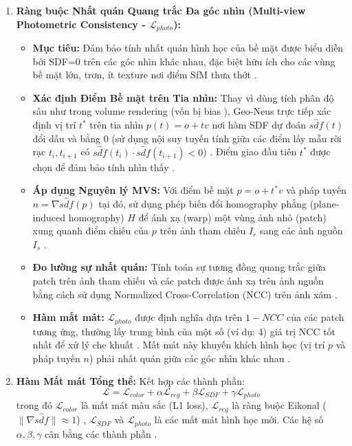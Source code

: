 \begin{enumerate}
    \item \textbf{Ràng buộc Nhất quán Quang trắc Đa góc nhìn (Multi-view Photometric Consistency - $\mathcal{L}_{photo}$):}
        \begin{itemize}
            \item \textbf{Mục tiêu:} Đảm bảo tính nhất quán hình học của bề mặt được biểu diễn bởi SDF=0 trên các góc nhìn khác nhau, đặc biệt hữu ích cho các vùng bề mặt lớn, trơn, ít texture nơi điểm SfM thưa thớt \cite{Fu2022GeoNeus_source_30, Fu2022GeoNeus_source_107, Fu2022GeoNeus_source_108, Fu2022GeoNeus_source_169}.
            \item \textbf{Xác định Điểm Bề mặt trên Tia nhìn:} Thay vì dùng tích phân độ sâu như trong volume rendering (vốn bị bias \cite{Fu2022GeoNeus_source_174, Fu2022GeoNeus_source_178}), Geo-Neus trực tiếp xác định vị trí $t^*$ trên tia nhìn $p(t) = o+tv$ nơi hàm SDF dự đoán $s\hat{d}f(t)$ đổi dấu và bằng 0 (sử dụng nội suy tuyến tính giữa các điểm lấy mẫu rời rạc $t_i, t_{i+1}$ có $s\hat{d}f(t_i) \cdot s\hat{d}f(t_{i+1}) < 0$) \cite{Fu2022GeoNeus_source_31, Fu2022GeoNeus_source_109, Fu2022GeoNeus_source_110, Fu2022GeoNeus_source_114, Fu2022GeoNeus_source_117, Fu2022GeoNeus_source_118}. Điểm giao đầu tiên $t^*$ được chọn để đảm bảo tính nhìn thấy \cite{Fu2022GeoNeus_source_119, Fu2022GeoNeus_source_120}.
            \item \textbf{Áp dụng Nguyên lý MVS:} Với điểm bề mặt $p = o+t^*v$ và pháp tuyến $n = \nabla s\hat{d}f(p)$ tại đó, sử dụng phép biến đổi homography phẳng (plane-induced homography) $H$ để ánh xạ (warp) một vùng ảnh nhỏ (patch) xung quanh điểm chiếu của $p$ trên ảnh tham chiếu $I_r$ sang các ảnh nguồn $I_s$ \cite{Fu2022GeoNeus_source_122, Fu2022GeoNeus_source_125, Fu2022GeoNeus_source_126, Fu2022GeoNeus_source_127, Hartley2004MVG}.
            \item \textbf{Đo lường sự nhất quán:} Tính toán sự tương đồng quang trắc giữa patch trên ảnh tham chiếu và các patch được ánh xạ trên ảnh nguồn bằng cách sử dụng Normalized Cross-Correlation (NCC) trên ảnh xám \cite{Fu2022GeoNeus_source_128, Fu2022GeoNeus_source_130, Furukawa2010MVS, Galliani2015Gipuma}.
            \item \textbf{Hàm mất mát:} $\mathcal{L}_{photo}$ được định nghĩa dựa trên $1 - NCC$ của các patch tương ứng, thường lấy trung bình của một số (ví dụ: 4) giá trị NCC tốt nhất để xử lý che khuất \cite{Fu2022GeoNeus_source_132}. Mất mát này khuyến khích hình học (vị trí $p$ và pháp tuyến $n$) phải nhất quán giữa các góc nhìn khác nhau \cite{Fu2022GeoNeus_source_133}.
        \end{itemize}

    \item \textbf{Hàm Mất mát Tổng thể:} Kết hợp các thành phần:
        $$\mathcal{L} = \mathcal{L}_{color} + \alpha\mathcal{L}_{reg} + \beta\mathcal{L}_{SDF} + \gamma\mathcal{L}_{photo}$$
        trong đó $\mathcal{L}_{color}$ là mất mát màu sắc (L1 loss), $\mathcal{L}_{reg}$ là ràng buộc Eikonal ($\|\nabla s\hat{d}f\| \approx 1$) \cite{Gropp2020IGR}, $\mathcal{L}_{SDF}$ và $\mathcal{L}_{photo}$ là các mất mát hình học mới. Các hệ số $\alpha, \beta, \gamma$ cân bằng các thành phần \cite{Fu2022GeoNeus_source_134}.
\end{enumerate}


